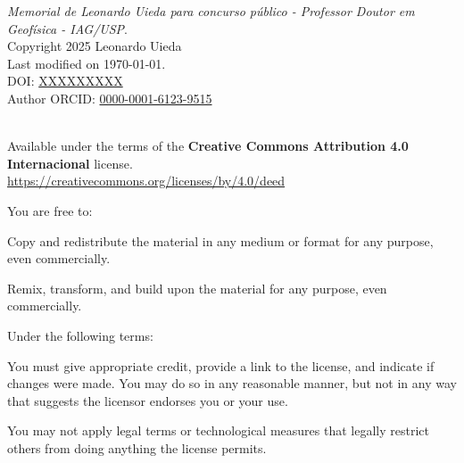 \documentclass[10pt,a4paper,oneside]{book}
\newcommand{\ThesisYear}{2025}
\newcommand{\ThesisAuthor}{Leonardo Uieda}
\newcommand{\ThesisTitle}{Memorial de \ThesisAuthor{} para concurso público - Professor Doutor em Geofísica - IAG/USP}
\newcommand{\ThesisDOI}{XXXXXXXXX}
\newcommand{\ORCID}{0000-0001-6123-9515}
\begin{document}
{\small

\vspace*{\fill}

\noindent
\textit{\ThesisTitle{}}.
\\[0.2cm]
\textcopyright{} Copyright \ThesisYear{} \ThesisAuthor{}
\\[0.2cm]
Last modified on \today.
\\[0.2cm]
DOI: \href{https://doi.org/\ThesisDOI}{\ThesisDOI}
\\[0.2cm]
Author ORCID: \href{https://orcid.org/\ORCID}{\ORCID}

\vspace{2.5cm}

\noindent
\textbf{\LARGE \faCreativeCommons{} \faCreativeCommonsBy{}}
\\
Available under the terms of the
\textbf{Creative Commons Attribution 4.0 Internacional} license.
\\
\url{https://creativecommons.org/licenses/by/4.0/deed}

\vspace{0.25cm}

\noindent
You are free to:

\begin{description}[labelindent=0.5cm]
    \item[Share ---]{
        Copy and redistribute the material in any medium or format for any
        purpose, even commercially.
    }
    \item[Adapt ---]{
        Remix, transform, and build upon the material for any purpose, even
        commercially.
    }
\end{description}

\vspace{0.25cm}

\noindent
Under the following terms:

\begin{description}[labelindent=0.5cm]
    \item[Attribution ---]{
        You must give appropriate credit, provide a link to the license, and
        indicate if changes were made. You may do so in any reasonable manner,
        but not in any way that suggests the licensor endorses you or your use.
    }
    \item[No additional restrictions ---]{
        You may not apply legal terms or technological measures that legally
        restrict others from doing anything the license permits.
}
\end{description}

\vspace{2cm}

}
\end{document}
